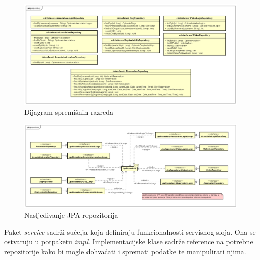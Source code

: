 		    \begin{figure}[H]
    			    \includegraphics[scale=0.34]{dijagrami/classdiagram-repository.png}
    			    \centering
    			    \caption{Dijagram spremišnih razreda}
    			    \label{fig:classdiagram-repository}
		    \end{figure}
		    
		    
		    
		     \begin{figure}[H]
    			    \includegraphics[scale=0.31]{dijagrami/classdiagram-repository-jpa.png}
    			    \centering
    			    \caption{Nasljeđivanje JPA repozitorija}
    			    \label{fig:classdiagram-repository-jpa}
		    \end{figure}
		    
		    \bigskip
		    \noindent Paket \textit{service} sadrži sučelja koja definiraju funkcionalnosti servisnog sloja. Ona se ostvaruju u potpaketu \textit{impl}. Implementacijske klase sadrže reference na potrebne repozitorije kako bi mogle dohvaćati i spremati podatke te manipulirati njima.
		    
